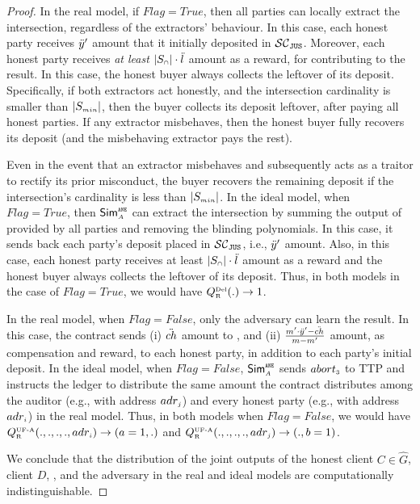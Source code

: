 \begin{proof}
In the real model, if $Flag=True$, then all parties can locally extract the intersection, regardless of the extractors' behaviour. In this case, each honest party receives $\ddot{y}'$ amount that it initially deposited in $\mathcal{SC}_{\mathtt{JUS}}$. Moreover, each honest party receives \emph{at least} $|S_{\scriptscriptstyle\cap}|\cdot \ddot{l}$ amount as a reward, for contributing to the result. In this case, the honest buyer always collects the leftover of its deposit. Specifically, if both extractors act honestly, and the intersection cardinality is smaller than $|S_{\scriptscriptstyle min}|$, then the buyer collects its deposit leftover, after paying all honest parties. If any extractor misbehaves, then the honest buyer fully recovers its deposit (and the misbehaving extractor pays the rest). 




Even in the event that an extractor misbehaves and subsequently acts as a traitor to rectify its prior misconduct,  the buyer recovers the remaining deposit if the intersection's cardinality is less than $|S_{\scriptscriptstyle min}|$.  In the ideal model, when $Flag=True$, then $\mathsf{Sim}^{\scriptscriptstyle \mathtt{ANE}}_{\scriptscriptstyle A}$ can extract the intersection by summing the output of \vopr provided by all parties and removing the blinding polynomials. In this case, it sends back each party's deposit placed in $\mathcal{SC}_{\mathtt{JUS}}$, i.e., $\ddot{y}'$ amount. Also, in this case, each honest party receives at least $|S_{\scriptscriptstyle\cap}|\cdot \ddot{l}$ amount as a reward and the honest buyer always collects the leftover of its deposit. Thus, in both models in the case of $Flag=True$, we would have $Q^{\scriptscriptstyle \text{Del}}_{\scriptscriptstyle\text{R}}(.)\rightarrow 1$. 




In the real model, when $Flag=False$, only the adversary can learn the result. In this case, the contract sends (i) $\ddot{ch}$ amount to \aud, and (ii) $\frac{m'\cdot \ddot{y}'-\ddot{ch}}{m-m'}$ amount, as compensation and reward, to each honest party, in addition to each party's initial deposit. In the ideal model,  when $Flag=False$, $\mathsf{Sim}^{\scriptscriptstyle \mathtt{ANE}}_{\scriptscriptstyle A}$ sends $abort_{\scriptscriptstyle 3}$ to TTP and instructs the ledger to distribute the same amount the contract distributes among the auditor (e.g., with address $adr_{\scriptscriptstyle j}$) and every honest party (e.g., with address $adr_{\scriptscriptstyle i}$) in the real model.  Thus, in both models when $Flag=False$, we would have $Q^{\scriptscriptstyle \text{UF-A}}_{\scriptscriptstyle \text{R}}(., ., ., ., adr_{\scriptscriptstyle i})\rightarrow (a=1, .)$ and  $Q^{\scriptscriptstyle \text{UF-A}}_{\scriptscriptstyle \text{R}}(., ., ., ., adr_{\scriptscriptstyle j})\rightarrow (., b=1)$. 

We conclude that the distribution of the joint outputs of the honest client $C\in \hat G$, client $D$, \aud, and the adversary in the real and ideal models are computationally indistinguishable.




\end{proof}
